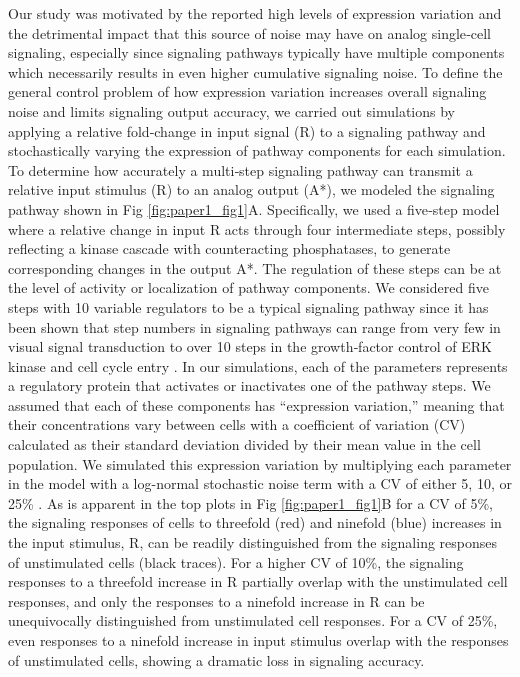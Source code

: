 Our study was motivated by the reported high levels of expression variation and the detrimental impact that this source of noise may have on analog single‐cell signaling, especially since signaling pathways typically have multiple components which necessarily results in even higher cumulative signaling noise. To define the general control problem of how expression variation increases overall signaling noise and limits signaling output accuracy, we carried out simulations by applying a relative fold‐change in input signal (R) to a signaling pathway and stochastically varying the expression of pathway components for each simulation. To determine how accurately a multi‐step signaling pathway can transmit a relative input stimulus (R) to an analog output (A*), we modeled the signaling pathway shown in Fig \ref{fig:paper1_fig1}A. Specifically, we used a five‐step model where a relative change in input R acts through four intermediate steps, possibly reflecting a kinase cascade with counteracting phosphatases, to generate corresponding changes in the output A*. The regulation of these steps can be at the level of activity or localization of pathway components. We considered five steps with 10 variable regulators to be a typical signaling pathway since it has been shown that step numbers in signaling pathways can range from very few in visual signal transduction \cite{Stryer1991} to over 10 steps in the growth‐factor control of ERK kinase and cell cycle entry \cite{Johnson2002}. In our simulations, each of the parameters represents a regulatory protein that activates or inactivates one of the pathway steps. We assumed that each of these components has “expression variation,” meaning that their concentrations vary between cells with a coefficient of variation (CV) calculated as their standard deviation divided by their mean value in the cell population. We simulated this expression variation by multiplying each parameter in the model with a log-normal stochastic noise term with a CV of either 5, 10, or 25\% \cite{Ahrends2014}. As is apparent in the top plots in Fig \ref{fig:paper1_fig1}B for a CV of 5\%, the signaling responses of cells to threefold (red) and ninefold (blue) increases in the input stimulus, R, can be readily distinguished from the signaling responses of unstimulated cells (black traces). For a higher CV of 10\%, the signaling responses to a threefold increase in R partially overlap with the unstimulated cell responses, and only the responses to a ninefold increase in R can be unequivocally distinguished from unstimulated cell responses. For a CV of 25\%, even responses to a ninefold increase in input stimulus overlap with the responses of unstimulated cells, showing a dramatic loss in signaling accuracy.

